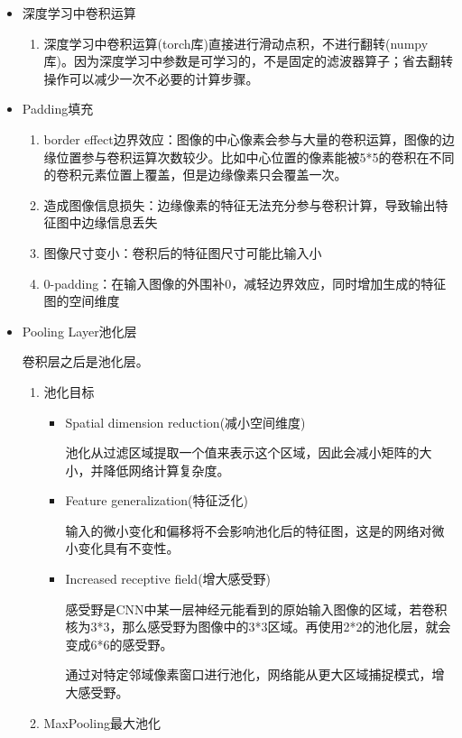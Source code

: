 \documentclass[UTF8]{ctexart}
\begin{document}
\begin{itemize}
    \item 深度学习中卷积运算
    \begin{enumerate}
        \item 深度学习中卷积运算(torch库)直接进行滑动点积，不进行翻转(numpy库)。因为深度学习中参数是可学习的，不是固定的滤波器算子；省去翻转操作可以减少一次不必要的计算步骤。
    \end{enumerate}
    \item Padding填充
    \begin{enumerate}
        \item border effect边界效应：图像的中心像素会参与大量的卷积运算，图像的边缘位置参与卷积运算次数较少。比如中心位置的像素能被5*5的卷积在不同的卷积元素位置上覆盖，但是边缘像素只会覆盖一次。
        \item 造成图像信息损失：边缘像素的特征无法充分参与卷积计算，导致输出特征图中边缘信息丢失
        \item 图像尺寸变小：卷积后的特征图尺寸可能比输入小
        \item 0-padding：在输入图像的外围补0，减轻边界效应，同时增加生成的特征图的空间维度
    \end{enumerate}
    \item Pooling Layer池化层
    
    卷积层之后是池化层。
    \begin{enumerate}
        \item 池化目标
        \begin{itemize}
            \item Spatial dimension reduction(减小空间维度)
            
            池化从过滤区域提取一个值来表示这个区域，因此会减小矩阵的大小，并降低网络计算复杂度。
            \item Feature generalization(特征泛化)
            
            输入的微小变化和偏移将不会影响池化后的特征图，这是的网络对微小变化具有不变性。
            \item Increased receptive field(增大感受野)
            
            感受野是CNN中某一层神经元能看到的原始输入图像的区域，若卷积核为3*3，那么感受野为图像中的3*3区域。再使用2*2的池化层，就会变成6*6的感受野。

            通过对特定邻域像素窗口进行池化，网络能从更大区域捕捉模式，增大感受野。
        \end{itemize}
        \item MaxPooling最大池化
        

\end{enumerate}
\end{itemize}
\end{document}
